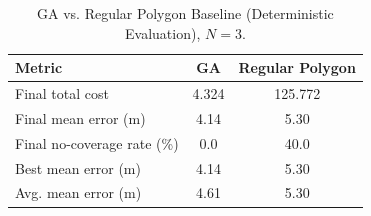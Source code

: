 \begin{table}[t]
\centering
\caption{GA vs. Regular Polygon Baseline (Deterministic Evaluation), $N=3$.}
\label{tab:ga_vs_polygon_n3}
\begin{tabular}{lcc}
\hline
Metric & GA & Regular Polygon \\
\hline
Final total cost & 4.324 & 125.772 \\
Final mean error (m) & 4.14 & 5.30 \\
Final no-coverage rate (\%) & 0.0 & 40.0 \\
Best mean error (m) & 4.14 & 5.30 \\
Avg. mean error (m) & 4.61 & 5.30 \\
\hline
\end{tabular}
\end{table}